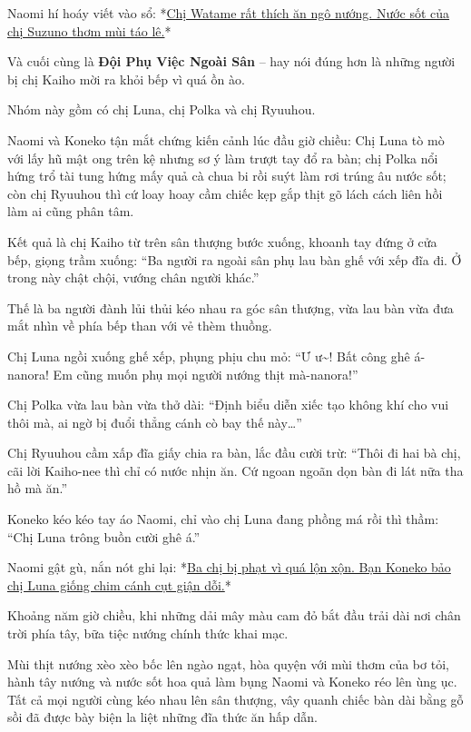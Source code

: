 \documentclass[../main.tex]{subfiles}
\begin{document}
Naomi hí hoáy viết vào sổ: *\uline{Chị Watame rất thích ăn ngô nướng. Nước sốt của chị Suzuno thơm mùi táo lê.}*

\ct

Và cuối cùng là \textbf{Đội Phụ Việc Ngoài Sân} -- hay nói đúng hơn là những người bị chị Kaiho mời ra khỏi bếp vì quá ồn ào.

Nhóm này gồm có chị Luna, chị Polka và chị Ryuuhou.

Naomi và Koneko tận mắt chứng kiến cảnh lúc đầu giờ chiều: Chị Luna tò mò với lấy hũ mật ong trên kệ nhưng sơ ý làm trượt tay đổ ra bàn; chị Polka nổi hứng trổ tài tung hứng mấy quả cà chua bi rồi suýt làm rơi trúng âu nước sốt; còn chị Ryuuhou thì cứ loay hoay cầm chiếc kẹp gắp thịt gõ lách cách liên hồi làm ai cũng phân tâm.

Kết quả là chị Kaiho từ trên sân thượng bước xuống, khoanh tay đứng ở cửa bếp, giọng trầm xuống: ``Ba người ra ngoài sân phụ lau bàn ghế với xếp đĩa đi. Ở trong này chật chội, vướng chân người khác.''

Thế là ba người đành lủi thủi kéo nhau ra góc sân thượng, vừa lau bàn vừa đưa mắt nhìn về phía bếp than với vẻ thèm thuồng.

Chị Luna ngồi xuống ghế xếp, phụng phịu chu mỏ: ``Ư ư\~{}! Bất công ghê á-nanora! Em cũng muốn phụ mọi người nướng thịt mà-nanora!''

Chị Polka vừa lau bàn vừa thở dài: ``Định biểu diễn xiếc tạo không khí cho vui thôi mà, ai ngờ bị đuổi thẳng cánh cò bay thế này\dots''

Chị Ryuuhou cầm xấp đĩa giấy chia ra bàn, lắc đầu cười trừ: ``Thôi đi hai bà chị, cãi lời Kaiho-nee thì chỉ có nước nhịn ăn. Cứ ngoan ngoãn dọn bàn đi lát nữa tha hồ mà ăn.''

Koneko kéo kéo tay áo Naomi, chỉ vào chị Luna đang phồng má rồi thì thầm: ``Chị Luna trông buồn cười ghê á.''

Naomi gật gù, nắn nót ghi lại: *\uline{Ba chị bị phạt vì quá lộn xộn. Bạn Koneko bảo chị Luna giống chim cánh cụt giận dỗi.}*

\ct

Khoảng năm giờ chiều, khi những dải mây màu cam đỏ bắt đầu trải dài nơi chân trời phía tây, bữa tiệc nướng chính thức khai mạc.

Mùi thịt nướng xèo xèo bốc lên ngào ngạt, hòa quyện với mùi thơm của bơ tỏi, hành tây nướng và nước sốt hoa quả làm bụng Naomi và Koneko réo lên ùng ục. Tất cả mọi người cùng kéo nhau lên sân thượng, vây quanh chiếc bàn dài bằng gỗ sồi đã được bày biện la liệt những đĩa thức ăn hấp dẫn.
\end{document}
